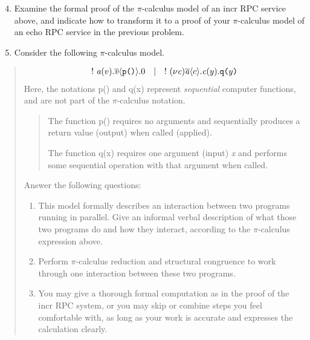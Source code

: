\documentclass[letterpaper,10pt,openany,oneside]{sphinxmanual}
\begin{document}
\begin{enumerate}
\setcounter{enumi}{3}
\item {} 
Examine the formal proof of the $\pi$-calculus model of an incr RPC service above, and indicate how to transform it to a proof of your $\pi$-calculus model of an echo RPC service in the previous problem.

\end{enumerate}
\begin{enumerate}
\setcounter{enumi}{4}
\item {} 
Consider the following $\pi$-calculus model.

\end{enumerate}
\begin{quote}
\begin{gather}
\begin{split}!\ {\it a}(v).\overline{\it v}\langle \hbox{\tt p()} \rangle.{0}\quad | \quad !\ (\nu{\it c})\overline{\it a}\langle c \rangle.{\it c}(y).{\hbox{\tt q($y$)}}\end{split}\notag
\end{gather}
Here, the notations p() and q(x) represent \emph{sequential} computer functions, and are not part of the $\pi$-calculus notation.
\begin{quote}

The function p() requires no arguments and sequentially produces a return value (output) when called (applied).

The function q(x) requires one argument (input) \emph{x} and performs some sequential operation with that argument when called.
\end{quote}

Answer the following questions:
\begin{enumerate}
\item {} 
This model formally describes an interaction between two programs running in parallel. Give an informal verbal description of what those two programs do and how they interact, according to the $\pi$-calculus expression above.

\item {} 
Perform $\pi$-calculus reduction and structural congruence to work through one interaction between these two programs.

\item {} 
You may give a thorough formal computation as in the proof of the incr RPC system, or you may skip or combine steps you feel comfortable with, as long as your work is accurate and expresses the calculation clearly.

\end{enumerate}
\end{quote}
\end{document}
